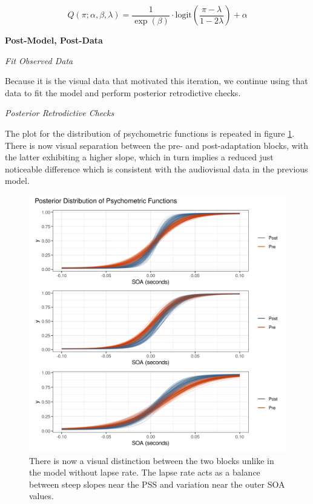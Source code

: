 \documentclass[11pt, oneside, openany]{scrbook}
\begin{document}
\begin{equation}
Q(\pi; \alpha, \beta, \lambda) = \frac{1}{\exp(\beta)} \cdot \mathrm{logit}\left(\frac{\pi - \lambda}{1-2\lambda}\right) + \alpha
\label{eq:Psi-Q}
\end{equation}

\textbf{Post-Model, Post-Data}

\emph{Fit Observed Data}

Because it is the visual data that motivated this iteration, we continue using that data to fit the model and perform posterior retrodictive checks.

\emph{Posterior Retrodictive Checks}

The plot for the distribution of psychometric functions is repeated in figure \ref{fig:ch044-Screaming-Proton}. There is now visual separation between the pre- and post-adaptation blocks, with the latter exhibiting a higher slope, which in turn implies a reduced just noticeable difference which is consistent with the audiovisual data in the previous model.

\begin{figure}

{\centering \includegraphics[width=0.85\linewidth]{figures/ch044-Screaming-Proton} 

}

\caption{There is now a visual distinction between the two blocks unlike in the model without lapse rate. The lapse rate acts as a balance between steep slopes near the PSS and variation near the outer SOA values.}\label{fig:ch044-Screaming-Proton}
\end{figure}
\end{document}
